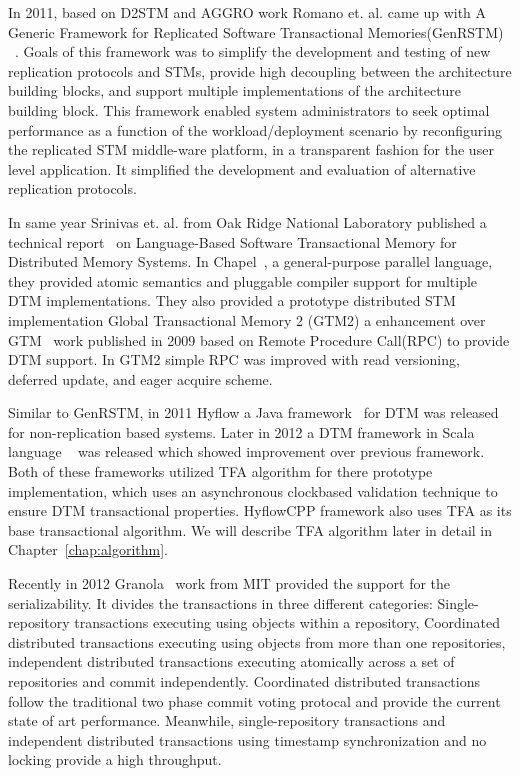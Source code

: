 \documentclass[12pt,english]{report}
\begin{document}
In 2011, based on D2STM and AGGRO work Romano et. al. came up with A Generic Framework for Replicated Software Transactional Memories(GenRSTM) ~\cite{GenRSTM:6038614}. Goals of this framework was to simplify the development and testing of new replication protocols and STMs, provide high decoupling between the architecture building blocks, and support multiple implementations of the architecture building block. This framework enabled system administrators to seek optimal performance as a function of the workload/deployment scenario by reconfiguring the replicated STM middle-ware platform, in a transparent fashion for the
user level application. It simplified the development and evaluation of alternative replication protocols.

In same year Srinivas et. al. from Oak Ridge National Laboratory published a technical report~\cite{sridharan2011scalable} on Language-Based Software Transactional Memory for Distributed Memory Systems. In Chapel~\cite{chapel:Language}, a general-purpose parallel language, they provided atomic semantics and pluggable compiler support for multiple DTM implementations. They also provided a prototype distributed STM implementation Global Transactional Memory 2 (GTM2) a enhancement over GTM~\cite{sridharan2009scalable} work published in 2009 based on Remote Procedure Call(RPC) to provide DTM  support. In GTM2 simple RPC was improved with read versioning, deferred update, and eager acquire scheme.

Similar to GenRSTM, in 2011 Hyflow a Java framework~\cite{Saad:2011:HHP:1996130.1996167} for DTM was released for non-replication based systems. Later in 2012 a DTM framework in Scala language ~\cite{turcuhyflow2}  was released which showed improvement over previous framework. Both of these frameworks utilized TFA algorithm for there prototype implementation, which uses an asynchronous clockbased validation technique to ensure DTM transactional properties. HyflowCPP framework also uses TFA as its base transactional algorithm. We will describe TFA algorithm later in detail in Chapter~\ref{chap:algorithm}.

Recently in 2012 Granola~\cite{cowling2012granola} work from MIT provided the support for the serializability. It divides the transactions in three different categories: Single-repository transactions executing using objects within a repository, Coordinated distributed transactions executing using objects from more than one repositories, independent distributed transactions executing atomically across a set of repositories and commit independently. Coordinated distributed transactions follow the traditional two phase commit voting protocal and provide the current state of art performance. Meanwhile, single-repository transactions and independent distributed transactions using timestamp synchronization and no locking provide a high throughput.   
\end{document}
